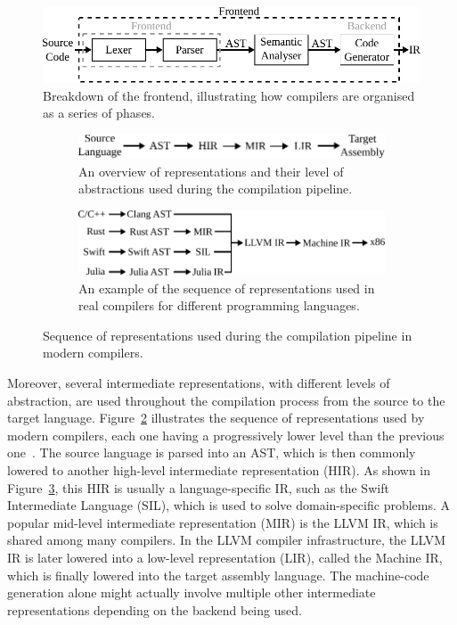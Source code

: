 \begin{figure}[h]
  \centering
  \includegraphics[scale=0.9]{src/background/figs/compiler-frontend.pdf}
  \caption{Breakdown of the frontend, illustrating how compilers are organised as a series of phases.}
  \label{fig:compiler-frontend}
\end{figure}

\begin{figure}[h]
\centering
\begin{subfigure}{\textwidth}
\centering
  \includegraphics[scale=0.9]{src/background/figs/ir-lowering-sequence.pdf}
  \caption{An overview of representations and their level of abstractions used during the compilation pipeline.}
  \label{fig:ir-lowering-sequence-general}
\end{subfigure}
\begin{subfigure}{\textwidth}
\centering
  \includegraphics[scale=0.9]{src/background/figs/ir-lowering-sequence-example.pdf}
  \caption{An example of the sequence of representations used in real compilers for different programming languages.}
  \label{fig:ir-lowering-sequence-example}
\end{subfigure}
\caption{Sequence of representations used during the compilation pipeline in modern compilers.}
\label{fig:ir-lowering-sequence}
\end{figure}

Moreover, several intermediate representations, with different levels of abstraction, are used throughout the compilation process from the source to the target language.
Figure~\ref{fig:ir-lowering-sequence-general} illustrates the sequence of representations used by modern compilers, each one having a progressively lower level than the previous one~\cite{lattner20}.
The source language is parsed into an AST, which is then commonly lowered to another high-level intermediate representation (HIR).
As shown in Figure~\ref{fig:ir-lowering-sequence-example}, this HIR is usually a language-specific IR, such as the Swift Intermediate Language (SIL), which is used to solve domain-specific problems.
A popular mid-level intermediate representation (MIR) is the LLVM IR, which is shared among many compilers.
In the LLVM compiler infrastructure, the LLVM IR is later lowered into a low-level representation (LIR), called the Machine IR, which is finally lowered into the target assembly language.
The machine-code generation alone might actually involve multiple other intermediate representations depending on the backend being used.

